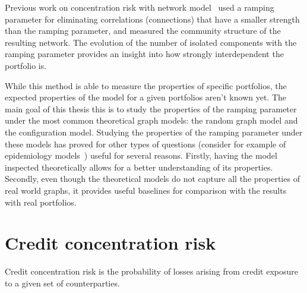 \documentclass[12pt,beltcrest]{ociamthesis} %
\begin{document}
Previous work on concentration risk with network model~\cite{Sindel:2009vd} used a ramping parameter for eliminating correlations (connections) that have a smaller strength than the ramping parameter, and measured the community structure of the resulting network. The evolution of the number of isolated components with the ramping parameter provides an insight into how strongly interdependent the portfolio is.

While this method is able to measure the properties of specific portfolios, the expected properties of the model for a given portfolios aren't known yet.
The main goal of this thesis this is to study the properties of the ramping parameter under the most common theoretical graph models: the random graph model and the configuration model.
Studying the properties of the ramping parameter under these models has proved for other types of questions (consider for example of epidemiology models~\cite{keeling2005networkspublisher}) useful for several reasons.
Firstly, having the model inspected theoretically allows for a better understanding of its properties.
Secondly, even though the theoretical models do not capture all the properties of real world graphs, it provides useful baselines for comparison with the results with real portfolios.





\section{Credit concentration risk} %
\label{sec:credit_concentration_risk}

Credit concentration risk is the probability of losses arising from credit exposure to a given set of counterparties.


\end{document}
